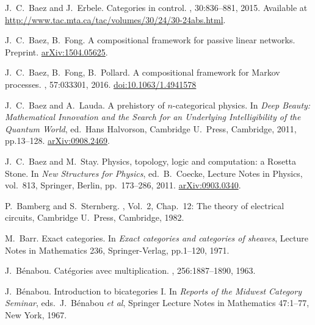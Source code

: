 \begin{thebibliography}{RSW00}
    J.\ C.\ Baez and J.\ Erbele.
    \newblock Categories in control. 
    , { 30}:836--881,
    2015. 
    \newblock Available at
    \href{http://www.tac.mta.ca/tac/volumes/30/24/30-24abs.html}{http://www.tac.mta.ca/tac/volumes/30/24/30-24abs.html}.

    J.\ C.\ Baez, B.\ Fong. 
    \newblock A compositional framework for passive linear networks.
    \newblock Preprint. 
    \newblock \href{http://arxiv.org/abs/1504.05625}{arXiv:1504.05625}. 

    J.\ C.\ Baez, B.\ Fong, B.\ Pollard. 
    \newblock A compositional framework for Markov processes.
    , 57:033301, 2016.  
    \newblock \href{http://dx.doi.org/10.1063/1.4941578}{doi:10.1063/1.4941578}

    J.\ C.\ Baez and A.\ Lauda.
    \newblock A prehistory of $n$-categorical
    physics. 
    \newblock In {\em Deep Beauty: Mathematical Innovation and
    the Search for an Underlying Intelligibility of the Quantum World}, ed.\
    Hans Halvorson, Cambridge U.\ Press, Cambridge, 2011, pp.13--128.  
    \newblock \href{http://arxiv.org/abs/0908.2469}{arXiv:0908.2469}.

    J.\ C.\ Baez and M.\ Stay. 
    \newblock Physics, topology, logic and 
    computation: a Rosetta Stone. 
    \newblock In {\sl New Structures for Physics}, ed.\ B.\ Coecke,  
    Lecture Notes in Physics, vol.\ 813, Springer, Berlin, pp.\ 173--286, 2011.
    \newblock \href{http://arxiv.org/abs/0903.0340}{arXiv:0903.0340}.

    P.\ Bamberg and S.\ Sternberg. 
    , Vol.\ 2, Chap.\ 12: The theory of electrical circuits,
    Cambridge U.\ Press, Cambridge, 1982. 

    M.\ Barr.
    \newblock Exact categories.
    \newblock In {\em Exact categories and categories of sheaves}, Lecture Notes in
    Mathematics 236, Springer-Verlag, pp.1--120, 1971.

    J.\ B\'enabou.
    \newblock Cat\'egories avec multiplication. 
    , 256:1887--1890, 1963.

    J.\ B\'enabou.
    \newblock Introduction to bicategories I.
    \newblock In \textsl{Reports
    of the Midwest Category Seminar}, eds.\ J.\ B\'enabou \textit{et al},
    Springer Lecture Notes in Mathematics { 47}:1--77, New York, 1967.


\end{thebibliography}
